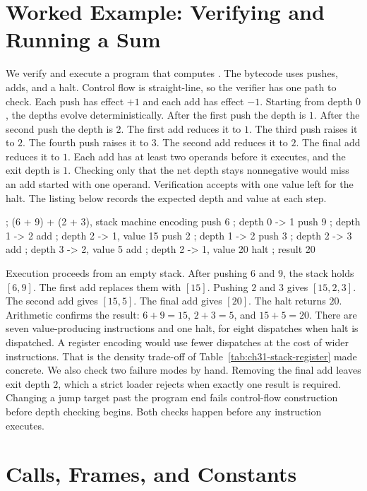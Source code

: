 \section{Worked Example: Verifying and Running a Sum}\label{sec:ch31-worked}

We verify and execute a program that computes .
The bytecode uses pushes, adds, and a halt.
Control flow is straight-line, so the verifier has one path to check.
Each push has effect $+1$ and each add has effect $-1$.
Starting from depth $0$, the depths evolve deterministically.
After the first push the depth is $1$.
After the second push the depth is $2$.
The first add reduces it to $1$.
The third push raises it to $2$.
The fourth push raises it to $3$.
The second add reduces it to $2$.
The final add reduces it to $1$.
Each add has at least two operands before it executes, and the exit depth is $1$.
Checking only that the net depth stays nonnegative would miss an add started with one operand.
Verification accepts with one value left for the halt.
The listing below records the expected depth and value at each step.
\begin{irlisting}
; (6 + 9) + (2 + 3), stack machine encoding
push 6        ; depth 0 -> 1
push 9        ; depth 1 -> 2
add           ; depth 2 -> 1, value 15
push 2        ; depth 1 -> 2
push 3        ; depth 2 -> 3
add           ; depth 3 -> 2, value 5
add           ; depth 2 -> 1, value 20
halt          ; result 20
\end{irlisting}
Execution proceeds from an empty stack.
After pushing $6$ and $9$, the stack holds $[6, 9]$.
The first add replaces them with $[15]$.
Pushing $2$ and $3$ gives $[15, 2, 3]$.
The second add gives $[15, 5]$.
The final add gives $[20]$.
The halt returns $20$.
Arithmetic confirms the result: $6 + 9 = 15$, $2 + 3 = 5$, and $15 + 5 = 20$.
There are seven value-producing instructions and one halt, for eight dispatches when halt is dispatched.
A register encoding would use fewer dispatches at the cost of wider instructions.
That is the density trade-off of Table~\ref{tab:ch31-stack-register} made concrete.
We also check two failure modes by hand.
Removing the final add leaves exit depth $2$, which a strict loader rejects when exactly one result is required.
Changing a jump target past the program end fails control-flow construction before depth checking begins.
Both checks happen before any instruction executes.

\section{Calls, Frames, and Constants}\label{sec:ch31-calls}

